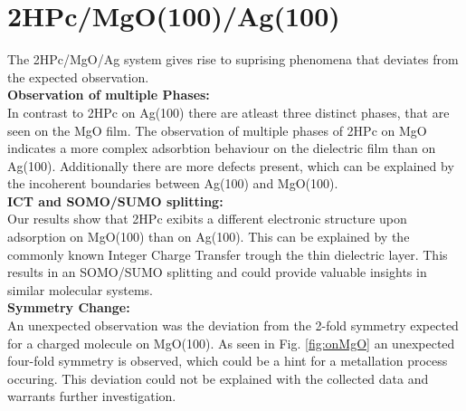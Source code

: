 \section{2HPc/MgO(100)/Ag(100)}
The 2HPc/MgO/Ag system gives rise to suprising phenomena that deviates from the expected observation.\\
\textbf{Observation of multiple Phases:}\\
In contrast to 2HPc on Ag(100) there are atleast three distinct phases, that are seen on the MgO film.
The observation of multiple phases of 2HPc on MgO indicates a more complex  adsorbtion behaviour on the dielectric film than on Ag(100).
Additionally there are more defects present, which can be explained by the incoherent boundaries between Ag(100) and MgO(100). \\
\textbf{ICT and SOMO/SUMO splitting:} \\ 
Our results show that 2HPc exibits a different electronic structure upon adsorption on MgO(100) than on Ag(100).
This can be explained by the commonly known Integer Charge Transfer trough the thin dielectric layer.
This results in an SOMO/SUMO splitting and could provide valuable insights in similar molecular systems.\\

\textbf{Symmetry Change:}\\ 
An unexpected observation was the deviation from the 2-fold symmetry expected for a charged molecule on MgO(100).
As seen in Fig. \ref{fig:onMgO} an unexpected four-fold symmetry is observed, which could be a hint for a metallation process occuring.
This deviation could not be explained with the collected data and warrants further investigation.

